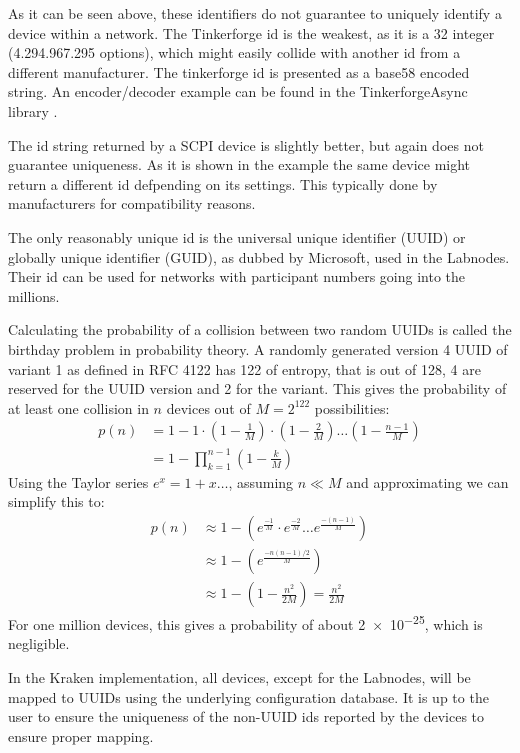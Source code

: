 As it can be seen above, these identifiers do not guarantee to uniquely identify a device within a network. The Tinkerforge id is the weakest, as it is a \qty{32}{\bit} integer (4.294.967.295 options), which might easily collide with another id from a different manufacturer. The tinkerforge id is presented as a base58 encoded string. An encoder/decoder example can be found in the TinkerforgeAsync library \cite{TinkerforgeAsync}.

The id string returned by a SCPI device is slightly better, but again does not guarantee uniqueness. As it is shown in the example the same device might return a different id defpending on its settings. This typically done by manufacturers for compatibility reasons.

The only reasonably unique id is the universal unique identifier (UUID) or globally unique identifier (GUID), as dubbed by Microsoft, used in the Labnodes. Their id can be used for networks with participant numbers going into the millions.

Calculating the probability of a collision between two random UUIDs is called the birthday problem \cite{BirthdayProblem} in probability theory. A randomly generated version 4 UUID of variant 1 as defined in RFC 4122 \cite{RFC-UUID} has \qty{122}{\bit} of entropy, that is out of \qty{128}{\bit}, \qty{4}{\bit} are reserved for the UUID version and \qty{2}{\bit} for the variant. This gives the probability of at least one collision in $n$ devices out of $M = 2^{122}$ possibilities:
\begin{align}
    p(n) &= 1 - 1 \cdot \left(1 - \frac{1}{M}\right) \cdot \left(1 - \frac{2}{M}\right) \dots \left(1 - \frac{n-1}{M}\right) \nonumber\\
    &= 1 - \prod_{k=1}^{n-1} \left(1 - \frac{k}{M} \right)
\end{align}
Using the Taylor series $e^x = 1+x \dots$, assuming $n \ll M$ and approximating we can simplify this to:
\begin{align}
    p(n) &\approx 1 - \left(e^\frac{-1}{M} \cdot e^\frac{-2}{M} \dots e^\frac{-(n-1)}{M} \right) \nonumber\\
    &\approx 1 - \left(e^\frac{-n(n-1)/2}{M} \right) \nonumber\\
    &\approx 1 - \left(1 - \frac{n^2}{2 M} \right) = \frac{n^2}{2 M}
\end{align}
For one million devices, this gives a probability of about \num{2e-25}, which is negligible.

In the Kraken implementation, all devices, except for the Labnodes, will be mapped to UUIDs using the underlying configuration database. It is up to the user to ensure the uniqueness of the non-UUID ids reported by the devices to ensure proper mapping.


